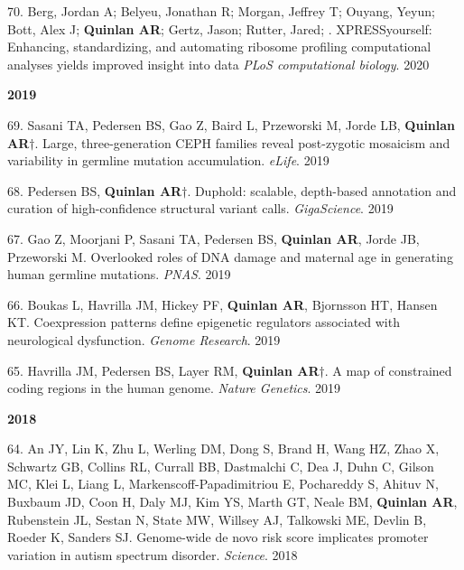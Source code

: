 \documentclass[margin,line]{cv}
\begin{document}
\begin{resume}
\begin{list}{*}{}
    \item[70.] Berg, Jordan A; Belyeu, Jonathan R; Morgan, Jeffrey T; Ouyang, Yeyun; Bott, Alex J; \textbf{Quinlan AR}; Gertz, Jason; Rutter, Jared; . XPRESSyourself: Enhancing, standardizing, and automating ribosome profiling computational analyses yields improved insight into data \emph{PLoS computational biology}. 2020

    \end{list}  

    \textbf{2019} \\

    \begin{list}{*}{}

    \item[69.] Sasani TA, Pedersen BS, Gao Z, Baird L,  Przeworski M, Jorde LB, \textbf{Quinlan AR}$\dagger$. Large, three-generation CEPH families reveal post-zygotic mosaicism and variability in germline mutation accumulation. \emph{eLife}. 2019

    \item[68.] Pedersen BS, \textbf{Quinlan AR}$\dagger$. Duphold: scalable, depth-based annotation and curation of high-confidence structural variant calls. \emph{GigaScience}. 2019

    \item[67.] Gao Z, Moorjani P, Sasani TA, Pedersen BS, \textbf{Quinlan AR}, Jorde JB, Przeworski M. Overlooked roles of DNA damage and maternal age in generating human germline mutations. \emph{PNAS}. 2019

    \item[66.] Boukas L, Havrilla JM, Hickey PF, \textbf{Quinlan AR}, Bjornsson HT, Hansen KT. Coexpression patterns define epigenetic regulators associated with neurological dysfunction. \emph{Genome Research}. 2019

    \item[65.] Havrilla JM, Pedersen BS, Layer RM, \textbf{   Quinlan AR}$\dagger$. A map of constrained coding regions in the human genome. \emph{Nature Genetics}. 2019
  
    \end{list}


    \textbf{2018} \\

    \begin{list}{*}{}


    \item[64.] An JY, Lin K, Zhu L, Werling DM, Dong S, Brand H, Wang HZ, Zhao X, Schwartz GB, Collins RL, Currall BB, Dastmalchi C, Dea J, Duhn C, Gilson MC, Klei L, Liang L, Markenscoff-Papadimitriou E, Pochareddy S, Ahituv N, Buxbaum JD, Coon H, Daly MJ, Kim YS, Marth GT, Neale BM, \textbf{Quinlan AR}, Rubenstein JL, Sestan N, State MW, Willsey AJ, Talkowski ME, Devlin B, Roeder K, Sanders SJ. Genome-wide de novo risk score implicates promoter variation in autism spectrum disorder. \emph{Science}. 2018


\end{list}
\end{resume}
\end{document}
